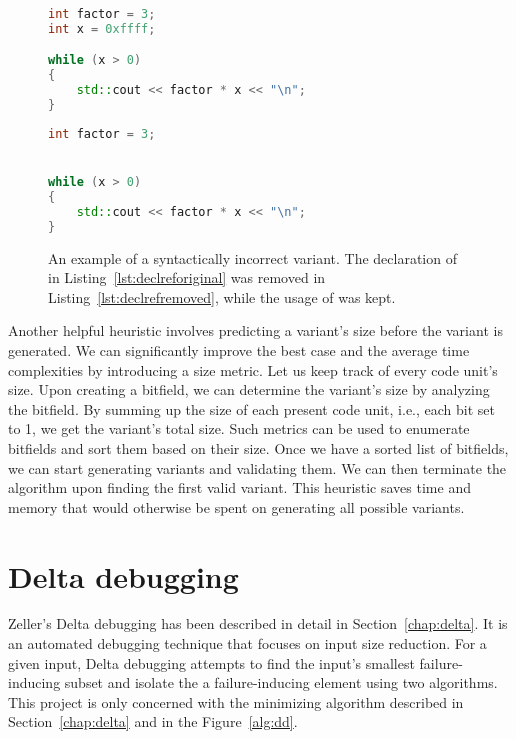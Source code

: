 \begin{figure}[H]
\begin{minipage}{0.46\textwidth}
\begin{lstlisting}[basicstyle=\small, caption=A variable declaration and its 
usage.,
  language=C++, label={lst:declreforiginal}]
int factor = 3;
int x = 0xffff;

while (x > 0)
{
	std::cout << factor * x << "\n";
}
\end{lstlisting}
\end{minipage}
\hfill
\begin{minipage}{.45\textwidth}
\begin{lstlisting}[basicstyle=\small, caption=Reference to an invalid 
declaration., language=C++, numbers=right, label={lst:declrefremoved}]
int factor = 3;


while (x > 0)
{
	std::cout << factor * x << "\n";
}
\end{lstlisting}
\end{minipage}
\caption{An example of a syntactically incorrect variant. The declaration
of  in Listing~\ref{lst:declreforiginal} was removed
in Listing~\ref{lst:declrefremoved}, while the usage of 
was kept.}
\label{lst:declref}
\end{figure}

Another helpful heuristic involves predicting a variant's size before 
the variant is generated. 
We can significantly improve the best case and the average time complexities 
by introducing a size metric. 
Let us keep track of every code unit's size. 
Upon creating a bitfield, we can determine the variant's size by analyzing 
the bitfield. 
By summing up the size of each present code unit, i.e., each bit set to 1, 
we get the variant's total size. 
Such metrics can be used to enumerate bitfields and sort them based on their 
size. 
Once we have a sorted list of bitfields, we can start generating variants 
and validating them. 
We can then terminate the algorithm upon finding the first valid variant. 
This heuristic saves time and memory that would otherwise be spent on 
generating all possible variants.

\section{Delta debugging}\label{chap:deltaanalysis}

Zeller's Delta debugging \cite{Zeller99, Zeller02, Zeller01} has been 
described in detail in Section~\ref{chap:delta}.
It is an automated debugging technique that focuses on input size reduction.
For a given input, Delta debugging attempts to find the input's 
smallest failure-inducing subset and isolate the a failure-inducing element 
using two algorithms.
This project is only concerned with the minimizing algorithm described in
Section~\ref{chap:delta} and in the Figure~\ref{alg:dd}.

